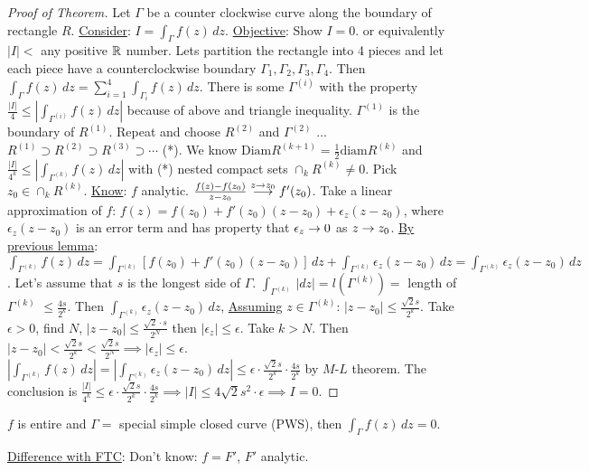 \documentclass[]{article}
\begin{document}
\begin{proof}
	[Proof of Theorem] Let $\Gamma$ be a counter clockwise curve along the boundary of rectangle $R$. \underline{Consider}: $I = \int_{\Gamma} f(z) \, dz$. \underline{Objective}: Show $I=0$. or equivalently $|I| < $ any positive $\mathbb{R}$ number. Lets partition the rectangle into 4 pieces and let each piece have a counterclockwise boundary $\Gamma_1,\Gamma_2,\Gamma_3,\Gamma_4$. Then $\int_{\Gamma} f(z) \, dz = \sum_{i=1}^4 \int_{\Gamma_i} f(z) \, dz$. There is some $\Gamma^{(i)}$ with the property $\frac{|I|}{4} \leq \left| \int_{\Gamma^{(i)}} f(z) \, dz \right|$ because of above and triangle inequality. $\Gamma^{(1)}$ is the boundary of $R^{(1)}$. Repeat and choose $R^{(2)}$ and $\Gamma^{(2)}$ $\dots$ $ R^{(1)} \supset R^{(2)} \supset R^{(3)} \supset \cdots$ (*). We know $\text{Diam} R^{(k+1)} = \frac{1}{2} \text{diam} R^{(k)}$ and $\frac{|I|}{4^k} \leq \left| \int_{\Gamma^{(k)}} f(z) \, dz \right| $ with (*) nested compact sets $\cap_k R^{(k)} \neq 0$. Pick $z_0 \in \cap_k R^{(k)}$.
	\underline{Know}: $f$ analytic. $\frac{f(z) - f(z_0)}{z-z_0} \overset{z\rightarrow z_0}{\longrightarrow} f'(z_0)$. Take a linear approximation of $f$: $f(z) = f(z_0) + f'(z_0)(z-z_0) + \epsilon_z ( z-z_0)$, where $\epsilon_z (z-z_0)$ is an error term and has property that $\epsilon_z \rightarrow 0$ as $z\rightarrow z_0$.
	\underline{By previous lemma}: $\int_{\Gamma^{(k)}} f(z) \, dz = \int_{\Gamma^{(k)}} [ f(z_0) + f'(z_0)(z-z_0)] \, dz + \int_{\Gamma^{(k)}} \epsilon_z ( z - z_0) \, dz = \int_{\Gamma^{(k)}} \epsilon_z ( z- z_0) \, dz$. 
	Let's assume that $s$ is the longest side of $\Gamma$. $\int_{\Gamma^{(k)}} \, |dz| = l(\Gamma^{(k)})   = $ length of $\Gamma^{(k)}$ $\leq \frac{4s}{2^k}$.
	Then $\int_{\Gamma^{(k)}} \epsilon_z (z- z_0) \, dz$, \underline{Assuming} $z\in\Gamma^{(k)}$: $|z-z_0| \leq \frac{\sqrt{2}s}{2^k}$.
	Take $\epsilon>0$, find $N$, $|z-z_0| \leq \frac{\sqrt{2} \cdot s}{2^N}$ then $|\epsilon_z| \leq \epsilon$. Take $k>N$. Then $|z-z_0| < \frac{\sqrt{2} s}{ 2^k} < \frac{\sqrt{2} s}{2^N} \implies |\epsilon_z | \leq \epsilon$.
	$\left| \int_{\Gamma^{(k)}} f(z) \, dz \right| = \left| \int_{\Gamma^{(k)}} \epsilon_z(z-z_0) \, dz \right| \leq \epsilon \cdot \frac{\sqrt{2}s}{2^k} \cdot \frac{4s}{2^k}$ by $M$-$L$ theorem. The conclusion is $\frac{|I|}{4^k} \leq \epsilon\cdot \frac{\sqrt{2}s}{2^k} \cdot \frac{4s}{2^k} \implies |I| \leq 4\sqrt{2} s^2 \cdot \epsilon \implies I=0$.
\end{proof}

\begin{theorem}
	$f$ is entire and $\Gamma = $ special simple closed curve (PWS), then $\int_{\Gamma} f(z) \, dz = 0$.
\end{theorem}
\underline{Difference with FTC}: Don't know: $f = F'$, $F'$ analytic.
\end{document}
